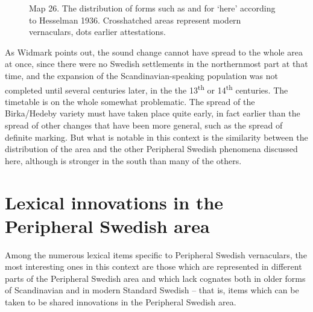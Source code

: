 \begin{figure}[h]

\begin{minipage}{5.875in}

\label{bkm:Ref176928280}Map 26. The distribution of forms such as  and  for ‘here’ according to Hesselman 1936. Crosshatched areas represent modern vernaculars, dots earlier attestations.


\end{minipage}

\end{figure}

As Widmark points out, the sound change  cannot have spread to the whole area at once, since there were no Swedish settlements in the northernmost part at that time, and the expansion of the Scandinavian-speaking population was not completed until several centuries later, in the the 13\textsuperscript{th} or 14\textsuperscript{th} centuries. The timetable is on the whole somewhat problematic. The spread of the Birka/Hedeby variety must have taken place quite early, in fact earlier than the spread of other changes that have been more general, such as the spread of definite marking. But what is notable in this context is the similarity between the distribution of the area and the other Peripheral Swedish phenomena discussed here, although  is stronger in the south than many of the others. 


\section{Lexical innovations in the Peripheral Swedish area}

Among the numerous lexical items specific to Peripheral Swedish vernaculars, the most interesting ones in this context are those which are represented in different parts of the Peripheral Swedish area and which lack cognates both in older forms of Scandinavian and in modern Standard Swedish – that is, items which can be taken to be shared innovations in the Peripheral Swedish area. 

